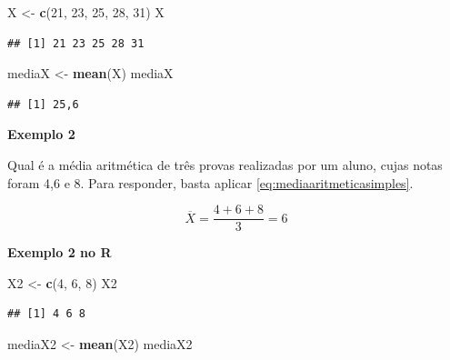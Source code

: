 \documentclass[
]{book}
\newenvironment{Shaded}{\begin{snugshade}}{\end{snugshade}}
\newcommand{\DecValTok}[1]{\textcolor[rgb]{0.00,0.00,0.81}{#1}}
\newcommand{\KeywordTok}[1]{\textcolor[rgb]{0.13,0.29,0.53}{\textbf{#1}}}
\newcommand{\NormalTok}[1]{#1}
\newcommand{\StringTok}[1]{\textcolor[rgb]{0.31,0.60,0.02}{#1}}
\begin{document}
\begin{Shaded}
\begin{Highlighting}[]
\NormalTok{X <-}\StringTok{ }\KeywordTok{c}\NormalTok{(}\DecValTok{21}\NormalTok{, }\DecValTok{23}\NormalTok{, }\DecValTok{25}\NormalTok{, }\DecValTok{28}\NormalTok{, }\DecValTok{31}\NormalTok{)}
\NormalTok{X}
\end{Highlighting}
\end{Shaded}

\begin{verbatim}
## [1] 21 23 25 28 31
\end{verbatim}

\begin{Shaded}
\begin{Highlighting}[]
\NormalTok{mediaX <-}\StringTok{ }\KeywordTok{mean}\NormalTok{(X)}
\NormalTok{mediaX}
\end{Highlighting}
\end{Shaded}

\begin{verbatim}
## [1] 25,6
\end{verbatim}

\textbf{Exemplo 2}

Qual é a média aritmética de três provas realizadas por um aluno, cujas notas
foram 4,6 e 8. Para responder, basta aplicar \eqref{eq:mediaaritmeticasimples}.

\begin{equation*}
  \overline{X} = \frac{4+6+8}{3} = 6
\end{equation*}

\textbf{Exemplo 2 no R}

\begin{Shaded}
\begin{Highlighting}[]
\NormalTok{X2 <-}\StringTok{ }\KeywordTok{c}\NormalTok{(}\DecValTok{4}\NormalTok{, }\DecValTok{6}\NormalTok{, }\DecValTok{8}\NormalTok{)}
\NormalTok{X2}
\end{Highlighting}
\end{Shaded}

\begin{verbatim}
## [1] 4 6 8
\end{verbatim}

\begin{Shaded}
\begin{Highlighting}[]
\NormalTok{mediaX2 <-}\StringTok{ }\KeywordTok{mean}\NormalTok{(X2)}
\NormalTok{mediaX2}
\end{Highlighting}
\end{Shaded}
\end{document}

